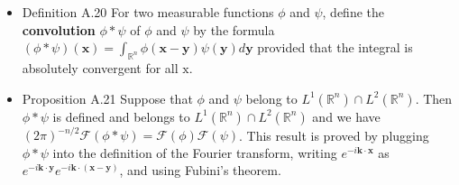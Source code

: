 \begin{itemize}
\item Definition A.20 For two measurable functions $\phi$ and $\psi$, define the \textbf{convolution} $\phi * \psi$ of $\phi$ and $\psi$ by the formula $(\phi * \psi)(\mathbf{x})=\int_{\mathbb{R}^{n}} \phi(\mathbf{x}-\mathbf{y}) \psi(\mathbf{y}) d \mathbf{y}$ provided that the integral is absolutely convergent for all $\mathrm{x}$.

\item Proposition A.21 Suppose that $\phi$ and $\psi$ belong to $L^{1}\left(\mathbb{R}^{n}\right) \cap L^{2}\left(\mathbb{R}^{n}\right)$. Then $\phi * \psi$ is defined and belongs to $L^{1}\left(\mathbb{R}^{n}\right) \cap L^{2}\left(\mathbb{R}^{n}\right)$ and we have $(2 \pi)^{-n / 2} \mathcal{F}(\phi * \psi)=\mathcal{F}(\phi) \mathcal{F}(\psi)$. This result is proved by plugging $\phi * \psi$ into the definition of the Fourier transform, writing $e^{-i \mathbf{k} \cdot \mathbf{x}}$ as $e^{-i \mathbf{k} \cdot \mathbf{y}} e^{-i \mathbf{k} \cdot(\mathbf{x}-\mathbf{y})}$, and using Fubini's theorem.
\end{itemize}

